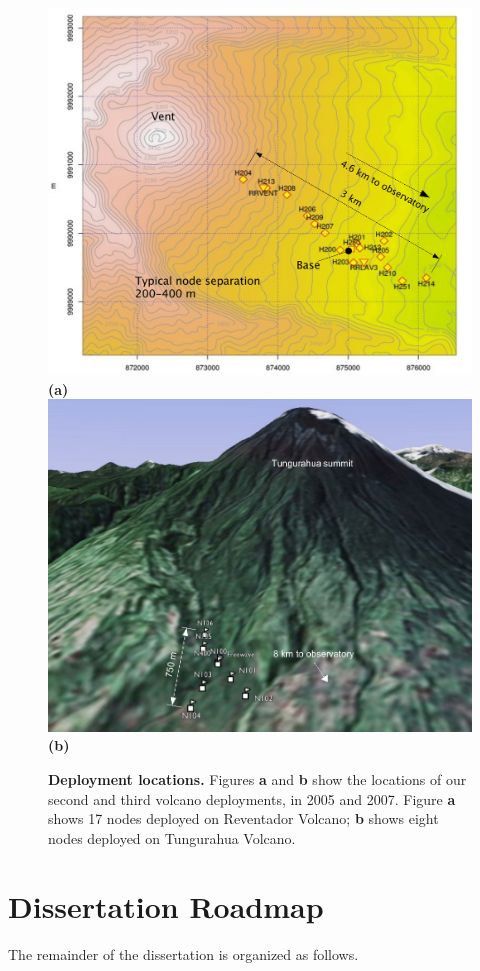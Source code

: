 \begin{figure}[]
\begin{center}
\includegraphics[width=1.0\hsize]{./5-evaluation/figs/pics/reventador-map.pdf}\\
\textbf{(a)}\\
\includegraphics[width=1.0\hsize]{./6-lance/figs/deploy/deployment-map.pdf}\\
\textbf{(b)}
\end{center}
\caption{{\bf Deployment locations.}
Figures \textbf{a} and \textbf{b} show the locations of our second and third volcano
deployments, in 2005 and 2007. Figure \textbf{a} shows 17 nodes deployed on Reventador
Volcano; \textbf{b} shows eight nodes deployed on Tungurahua Volcano.}
\label{fig-deployment-maps}
\end{figure}


\section{Dissertation Roadmap}

The remainder of the dissertation is organized as follows.


